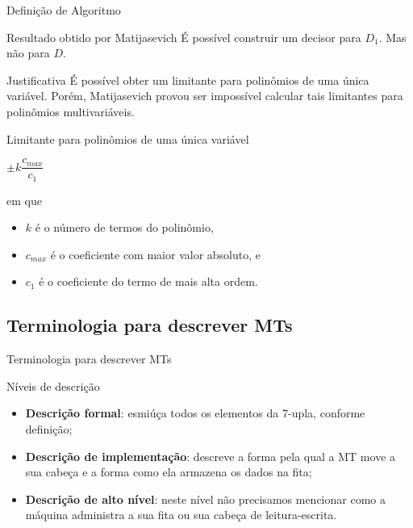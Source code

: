 \documentclass[xcolor=dvipsnames,table]{beamer}
\begin{document}
	\begin{frame}[shrink]{Definição de Algoritmo}
		\begin{block}{Resultado obtido por Matijasevich}
			É possível construir um decisor para $D_1$. Mas não para $D$.
		\end{block} \pause
		\begin{block}{Justificativa}
			É possível obter um limitante para polinômios de uma única variável. Porém, Matijasevich provou ser impossível calcular tais limitantes para polinômios multivariáveis.
		\end{block}\pause
		\begin{block}{Limitante para polinômios de uma única variável}
			\begin{center}
				$\pm k \dfrac{c_{max}}{c_1}$
			\end{center}
			em que 
			\begin{itemize}
				\item $k$ é o número de termos do polinômio,
				\item $c_{max}$ é o coeficiente com maior valor absoluto, e
				\item $c_1$ é o coeficiente do termo de mais alta ordem.
			\end{itemize}  
		\end{block}
	\end{frame}

	\subsection{Terminologia para descrever MTs}
	\begin{frame}{Terminologia para descrever MTs}
		\begin{block}{Níveis de descrição}
			\begin{itemize}
				\item<1,4> {\bf Descrição formal}: esmiúça todos os elementos da 7-upla, conforme definição;
				\item<2,4> {\bf Descrição de implementação}: descreve a forma pela qual a MT move a sua cabeça e a forma como ela armazena os dados na fita;
				\item<3,4> {\bf Descrição de alto nível}: neste nível não precisamos mencionar como a máquina administra a sua fita ou sua cabeça de leitura-escrita.
			\end{itemize}
		\end{block}
	\end{frame}
	
\end{document}
